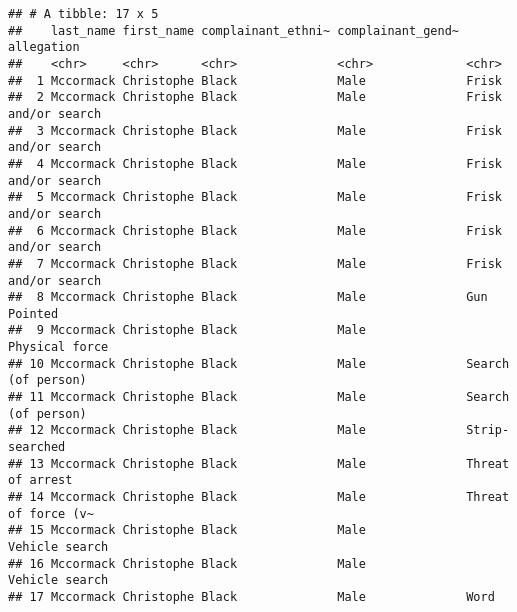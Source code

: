 \documentclass[
]{article}
\newenvironment{Shaded}{\begin{snugshade}}{\end{snugshade}}
\newcommand{\CommentTok}[1]{\textcolor[rgb]{0.56,0.35,0.01}{\textit{#1}}}
\newcommand{\KeywordTok}[1]{\textcolor[rgb]{0.13,0.29,0.53}{\textbf{#1}}}
\newcommand{\NormalTok}[1]{#1}
\newcommand{\OperatorTok}[1]{\textcolor[rgb]{0.81,0.36,0.00}{\textbf{#1}}}
\newcommand{\StringTok}[1]{\textcolor[rgb]{0.31,0.60,0.02}{#1}}
\begin{document}
\begin{verbatim}
## # A tibble: 17 x 5
##    last_name first_name complainant_ethni~ complainant_gend~ allegation         
##    <chr>     <chr>      <chr>              <chr>             <chr>              
##  1 Mccormack Christophe Black              Male              Frisk              
##  2 Mccormack Christophe Black              Male              Frisk and/or search
##  3 Mccormack Christophe Black              Male              Frisk and/or search
##  4 Mccormack Christophe Black              Male              Frisk and/or search
##  5 Mccormack Christophe Black              Male              Frisk and/or search
##  6 Mccormack Christophe Black              Male              Frisk and/or search
##  7 Mccormack Christophe Black              Male              Frisk and/or search
##  8 Mccormack Christophe Black              Male              Gun Pointed        
##  9 Mccormack Christophe Black              Male              Physical force     
## 10 Mccormack Christophe Black              Male              Search (of person) 
## 11 Mccormack Christophe Black              Male              Search (of person) 
## 12 Mccormack Christophe Black              Male              Strip-searched     
## 13 Mccormack Christophe Black              Male              Threat of arrest   
## 14 Mccormack Christophe Black              Male              Threat of force (v~
## 15 Mccormack Christophe Black              Male              Vehicle search     
## 16 Mccormack Christophe Black              Male              Vehicle search     
## 17 Mccormack Christophe Black              Male              Word
\end{verbatim}

\begin{Shaded}
\end{Shaded}
\end{document}
